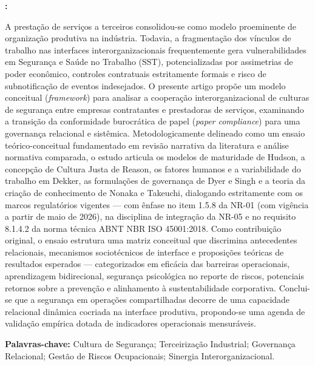 \documentclass[12pt,a4paper]{article}
\renewenvironment{abstract}{%
  \small\begin{list}{}{%
    \setlength{\leftmargin}{0cm}%
    \setlength{\rightmargin}{0cm}%
  }%
  \item\relax\textbf{\abstractname:}\space
}{\end{list}}
\begin{document}
\begin{abstract}
\fontsize{10}{12}\selectfont\singlespacing\justifying
A prestação de serviços a terceiros consolidou-se como modelo proeminente de organização produtiva na indústria. Todavia, a fragmentação dos vínculos de trabalho nas interfaces interorganizacionais frequentemente gera vulnerabilidades em Segurança e Saúde no Trabalho (SST), potencializadas por assimetrias de poder econômico, controles contratuais estritamente formais e risco de subnotificação de eventos indesejados. O presente artigo propõe um modelo conceitual (\textit{framework}) para analisar a cooperação interorganizacional de culturas de segurança entre empresas contratantes e prestadoras de serviços, examinando a transição da conformidade burocrática de papel (\textit{paper compliance}) para uma governança relacional e sistêmica. Metodologicamente delineado como um ensaio teórico-conceitual fundamentado em revisão narrativa da literatura e análise normativa comparada, o estudo articula os modelos de maturidade de Hudson, a concepção de Cultura Justa de Reason, os fatores humanos e a variabilidade do trabalho em Dekker, as formulações de governança de Dyer e Singh e a teoria da criação de conhecimento de Nonaka e Takeuchi, dialogando estritamente com os marcos regulatórios vigentes — com ênfase no item 1.5.8 da NR-01 (com vigência a partir de maio de 2026), na disciplina de integração da NR-05 e no requisito 8.1.4.2 da norma técnica ABNT NBR ISO 45001:2018. Como contribuição original, o ensaio estrutura uma matriz conceitual que discrimina antecedentes relacionais, mecanismos sociotécnicos de interface e proposições teóricas de resultados esperados — categorizados em eficácia das barreiras operacionais, aprendizagem bidirecional, segurança psicológica no reporte de riscos, potenciais retornos sobre a prevenção e alinhamento à sustentabilidade corporativa. Conclui-se que a segurança em operações compartilhadas decorre de uma capacidade relacional dinâmica cocriada na interface produtiva, propondo-se uma agenda de validação empírica dotada de indicadores operacionais mensuráveis.
\end{abstract}

\noindent\fontsize{10}{12}\selectfont\textbf{Palavras-chave:} Cultura de Segurança; Terceirização Industrial; Governança Relacional; Gestão de Riscos Ocupacionais; Sinergia Interorganizacional.
\end{document}
